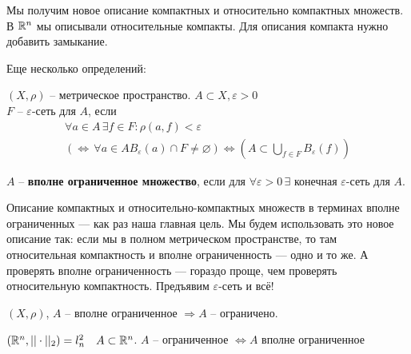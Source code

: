 \documentclass[document]{subfiles}
\begin{document}
Мы получим новое описание компактных и относительно компактных множеств. В $\mathbb{R}^n$ мы описывали относительные компакты. Для описания компакта 
нужно добавить замыкание.

Еще несколько определений:
\begin{definition}
    $(X, \rho)$ -- метрическое пространство. $A \subset X, \varepsilon > 0$ \\
    $F$ -- $\varepsilon$-сеть для $A$, если 
    \begin{multline*}
        \forall a \in A \, \exists f \in F: \rho(a,f) < \varepsilon \\
        (\Leftrightarrow \, \forall a \in A B_\varepsilon(a) \cap F \ne \varnothing) \Leftrightarrow (A \subset \bigcup_{f \in F} B_{\varepsilon}(f))
    \end{multline*}
\end{definition}

\begin{definition}
    $A$ -- \textbf{вполне ограниченное множество}, если для $\forall \varepsilon > 0 \, \exists$ конечная $\varepsilon$-сеть для $A$.
\end{definition}

Описание компактных и относительно-компактных множеств в терминах вполне ограниченных --- как раз наша главная цель.
Мы будем использовать это новое описание так: если мы в полном метрическом пространстве, то там относительная компактность и вполне ограниченность --- одно и то же.
А проверять вполне ограниченность --- гораздо проще, чем проверять относительную компактность. Предъявим $\varepsilon$-сеть и всё!

\begin{remark}
    $(X,\rho)$, $A$ -- вполне ограниченное $\Rightarrow A$ -- ограничено.
\end{remark}

\begin{example}
    $(\mathbb{R}^n, || \cdot ||_2) = l^2_n \quad A \subset \mathbb{R}^n$. $A$ -- ограниченное $\Leftrightarrow A$ вполне ограниченное
\end{example}
\end{document}
